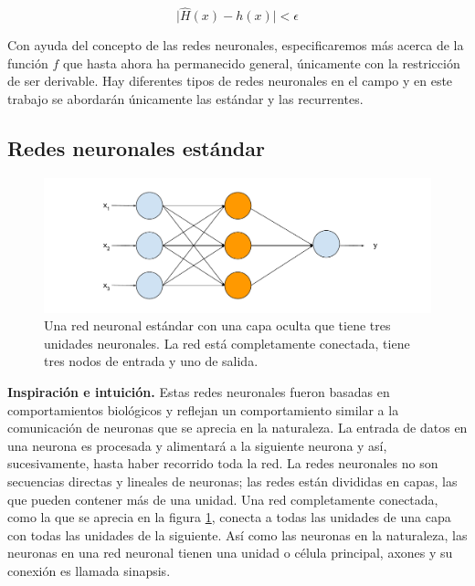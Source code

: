\begin{equation}
\label{eq:universaltheorem}
\vert \hat{H}(x) - h(x) \vert < \epsilon
\end{equation}

Con ayuda del concepto de las redes neuronales, especificaremos más acerca de la función $f$ que hasta ahora ha permanecido general, únicamente con la restricción de ser derivable. Hay diferentes tipos de redes neuronales en el campo y en este trabajo se abordarán únicamente las estándar y las recurrentes.

\subsection{Redes neuronales estándar}

\begin{figure}
	\includegraphics[scale=.6]{Figures/standardnn.pdf}
	\caption{Una red neuronal estándar con una capa oculta que tiene tres unidades neuronales. La red está completamente conectada, tiene tres nodos de entrada y uno de salida.}
	\label{fig:standardnn}
\end{figure}

\textbf{Inspiración e intuición.} Estas redes neuronales fueron basadas en comportamientos biológicos y reflejan un comportamiento similar a la comunicación de neuronas que se aprecia en la naturaleza. La entrada de datos en una neurona es procesada y alimentará a la siguiente neurona y así, sucesivamente, hasta haber recorrido toda la red. La redes neuronales no son secuencias directas y lineales de neuronas; las redes están divididas en capas, las que pueden contener más de una unidad. Una red completamente conectada, como la que se aprecia en la figura \ref{fig:standardnn}, conecta a todas las unidades de una capa con todas las unidades de la siguiente. Así como las neuronas en la naturaleza, las neuronas en una red neuronal tienen una unidad o célula principal, axones y su conexión es llamada sinapsis.

